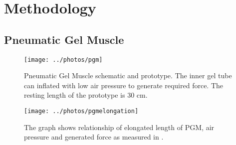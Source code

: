 \documentclass[letterpaper, 10 pt, conference]{ieeeconf}  %
\begin{document}
\section{Methodology} \label{methodology}

\subsection{Pneumatic Gel Muscle} \label{pgm}
\begin{figure}
	\centering
	\texttt{[image: ../photos/pgm]}
	\caption{Pneumatic Gel Muscle schematic and prototype. The inner gel tube can inflated with low air pressure to generate required force. The resting length of the prototype is 30 cm.}
	\label{fig:pgm}
\end{figure}
\begin{figure}
	\centering
	\texttt{[image: ../photos/pgmelongation]}
	\caption{The graph shows relationship of elongated length of PGM, air pressure and generated force as measured in \cite{14}.}
	\label{fig:pgmelongationratio}
\end{figure}
\end{document}
